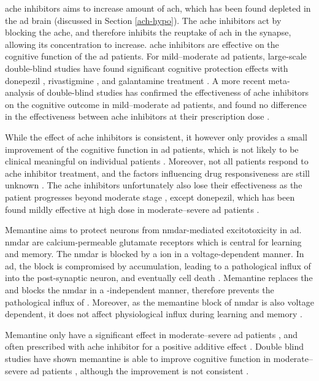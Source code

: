\Gls{ache} inhibitors aims to increase amount of \gls{ach}, which has been found depleted in the \gls{ad} brain (discussed in Section \ref{ach-hypo}). The \gls{ache} inhibitors act by blocking the \gls{ache}, and therefore inhibits the reuptake of \gls{ach} in the synapse, allowing its concentration to increase. \Gls{ache} inhibitors are effective on the cognitive function of the \gls{ad} patients. For mild--moderate \gls{ad} patients, large-scale double-blind studies have found significant cognitive protection effects with donepezil \citep{rogers98}, rivastigmine \citep{farlow00}, and galantamine treatment \citep{wilkinson01}. A more recent meta-analysis of double-blind studies has confirmed the effectiveness of \gls{ache} inhibitors on the cognitive outcome in mild--moderate \gls{ad} patients, and found no difference in the effectiveness between \gls{ache} inhibitors at their prescription dose \citep{tan14}.

While the effect of \gls{ache} inhibitors is consistent, it however only provides a small improvement of the cognitive function in \gls{ad} patients, which is not likely to be clinical meaningful on individual patients \citep{lin13}. Moreover, not all patients respond to \gls{ache} inhibitor treatment, and the factors influencing drug responsiveness are still unknown \citep{vanderputt06}. The \gls{ache} inhibitors unfortunately also lose their effectiveness as the patient progresses beyond moderate stage \citep{gillette-guyonnet11}, except donepezil, which has been found mildly effective at high dose in moderate--severe \gls{ad} patients \citep{sabbagh13}. 

Memantine aims to protect neurons from \gls{nmdar}-mediated excitotoxicity in \gls{ad}. \Gls{nmdar} are calcium-permeable glutamate receptors which is central for learning and memory. The \Gls{nmdar} is blocked by a  ion in a voltage-dependent manner. In \gls{ad}, the  block is compromised by \abeta{} accumulation, leading to a pathological influx of  into the post-synaptic neuron, and eventually cell death \citep{danysz12}. Memantine replaces the  and blocks the \gls{nmdar} in a \abeta{}-independent manner, therefore prevents the pathological influx of . Moreover, as the memantine block of \gls{nmdar} is also voltage dependent, it does not affect physiological  influx during learning and memory \citep{danysz12}.

Memantine only have a significant effect in moderate--severe \gls{ad} patients \citep{reisberg03, tariot04, schneider11}, and often prescribed with \gls{ache} inhibitor for a positive additive effect \citep{rountree09}. Double blind studies have shown memantine is able to improve cognitive function in moderate--severe \gls{ad} patients \citep{reisberg03, tariot04}, although the improvement is not consistent \citep{porsteinsson08}. 

